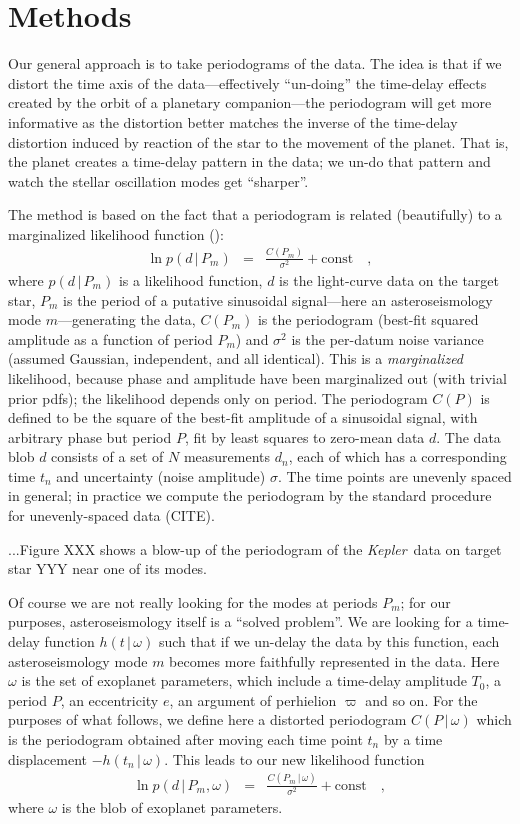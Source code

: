 \documentclass[12pt, preprint]{aastex}
\newcommand{\project}[1]{\textsl{#1}}
\newcommand{\Kepler}{\project{Kepler}}
\newcommand{\given}{\,|\,}
\begin{document}
\section{Methods}

Our general approach is to take periodograms of the data.
The idea is that if we distort the time axis of the data---effectively
``un-doing'' the time-delay effects created by the orbit of a
planetary companion---the periodogram will get more informative as the
distortion better matches the inverse of the time-delay distortion
induced by reaction of the star to the movement of the planet.
That is, the planet creates a time-delay pattern in the data; we un-do
that pattern and watch the stellar oscillation modes get ``sharper''.

The method is based on the fact that a periodogram is related
(beautifully) to a marginalized likelihood function
(\citealt{bretthorst}):
\begin{eqnarray}
\ln p(d\given P_m) &=& \frac{C(P_m)}{\sigma^2} + \mbox{const}
\quad,
\end{eqnarray}
where $p(d\given P_m)$ is a likelihood function, $d$ is the
light-curve data on the target star, $P_m$ is the period of a putative
sinusoidal signal---here an asteroseismology mode $m$---generating the
data, $C(P_m)$ is the periodogram (best-fit squared amplitude as a
function of period $P_m$) and $\sigma^2$ is the per-datum noise
variance (assumed Gaussian, independent, and all identical).
This is a \emph{marginalized} likelihood, because phase and amplitude
have been marginalized out (with trivial prior pdfs); the likelihood
depends only on period.
The periodogram $C(P)$ is defined to be the square of the best-fit
amplitude of a sinusoidal signal, with arbitrary phase but period $P$,
fit by least squares to zero-mean data $d$.
The data blob $d$ consists of a set of $N$ measurements $d_n$, each of
which has a corresponding time $t_n$ and uncertainty (noise amplitude)
$\sigma$.
The time points are unevenly spaced in general; in practice we compute
the periodogram by the standard procedure for unevenly-spaced data
(CITE).

...Figure XXX shows a blow-up of the periodogram of the \Kepler\ data
on target star YYY near one of its modes.

Of course we are not really looking for the modes at periods $P_m$;
for our purposes, asteroseismology itself is a ``solved problem''.
We are looking for a time-delay function $h(t\given \omega)$ such that
if we un-delay the data by this function, each asteroseismology mode
$m$ becomes more faithfully represented in the data.
Here $\omega$ is the set of exoplanet parameters, which include a
time-delay amplitude $T_0$, a period $P$, an eccentricity $e$, an
argument of perhielion $\varpi$ and so on.
For the purposes of what follows, we define here a distorted
periodogram $C(P\given\omega)$ which is the periodogram obtained after
moving each time point $t_n$ by a time displacement
$-h(t_n\given\omega)$.
This leads to our new likelihood function
\begin{eqnarray}
\ln p(d\given P_m, \omega) &=& \frac{C(P_m\given\omega)}{\sigma^2} + \mbox{const}
\quad,
\end{eqnarray}
where $\omega$ is the blob of exoplanet parameters.
\end{document}
